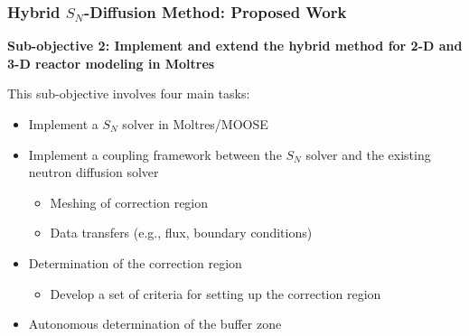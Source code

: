 \begin{frame}
  \frametitle{Hybrid $S_N$-Diffusion Method: Proposed Work}
  \textbf{Sub-objective 2: Implement and extend the hybrid method for 2-D and 3-D reactor modeling
  in Moltres}
  \vspace{.3cm}

  This sub-objective involves four main tasks:
  \begin{itemize}
    \item Implement a $S_N$ solver in Moltres/MOOSE
    \item Implement a coupling framework between the $S_N$ solver and the existing neutron
      diffusion solver
    \begin{itemize}
      \item Meshing of correction region
      \item Data transfers (e.g., flux, boundary conditions)
    \end{itemize}
    \item Determination of the correction region
      \begin{itemize}
        \item Develop a set of criteria for setting up the correction region
      \end{itemize}
    \item Autonomous determination of the buffer zone
  \end{itemize}
\end{frame}


